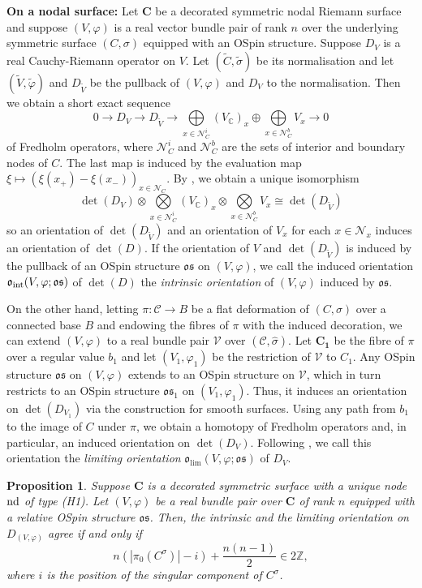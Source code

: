 \documentclass[11pt,psamsfonts, oneside, reqno]{amsart}
\newcommand{\cl}{\colon}
\newcommand{\bC}{\mathbb{C}}
\newcommand{\bZ}{\mathbb{Z}}
\newcommand{\cC}{\mathcal{C}}
\newcommand{\cN}{\mathcal{N}}
\newcommand{\cV}{\mathcal{V}}
\newcommand{\fo}{\mathfrak{o}}
\newcommand{\fs}{\mathfrak{s}}
\newcommand{\wt}{\widetilde}
\newcommand{\wh}{\widehat}
\newtheorem{proposition}[theorem]{Proposition}
\theoremstyle{definition}
\theoremstyle{remark}
\numberwithin{equation}{section}
\begin{document}
\noindent\textbf{On a nodal surface:} Let $\mathbf{C}$ be a decorated symmetric nodal Riemann surface and suppose $(V,\varphi)$ is a real vector bundle pair of rank $n$ over the underlying symmetric surface $(C,\sigma)$ equipped with an OSpin structure. Suppose $D_V$ is a real Cauchy-Riemann operator on $V$. Let $(\wt C,\wt\sigma)$ be its normalisation and let $(\wt V,\wt\varphi)$ and $D_{\wt V}$ be the pullback of $(V,\varphi)$ and $D_V$ to the normalisation. Then we obtain a short exact sequence 
$$0 \to D_V \to D_{\wt V}\to \bigoplus\limits_{x\in \cN^i_C}(V_\bC)_x\oplus \bigoplus\limits_{x\in \cN^b_C}V_x\to 0$$\noindent
of Fredholm operators, where $\cN^i_C$ and $\cN^b_C$ are the sets of interior and boundary nodes of $C$. The last map is induced by the evaluation map $\xi \mapsto (\xi(x_+)-\xi(x_-))_{x\in \cN_C}$. By \cite{Zi16}, we obtain a unique isomorphism 
$$\det(D_V) \otimes \bigotimes\limits_{x\in \cN^i_C}(V_\bC)_x\otimes \bigotimes\limits_{x\in \cN^b_C}V_x\cong \det(D_{\wt V})$$\noindent
so an orientation of $\det(D_{\wt V})$ and an orientation of $V_x$ for each $x \in \cN_x$ induces an orientation of $\det(D)$. If the orientation of $V$ and $\det(D_{\wt V})$ is induced by the pullback of an OSpin structure $\fo\fs$ on $(V,\varphi)$, we call the induced orientation $\fo_{\normalfont\text{int}}(V,\varphi;\fo\fs)$ of $\det(D)$ the \emph{intrinsic orientation} of $(V,\varphi)$ induced by $\fo\fs$.\par 
On the other hand, letting $\pi \cl \cC\to B$ be a flat deformation of $(C,\sigma)$ over a connected base $B$ and endowing the fibres of $\pi$ with the induced decoration, we can extend $(V,\varphi)$ to a real bundle pair $\cV$ over $(\cC,\wh\sigma)$. Let $\mathbf{C_1}$ be the fibre of $\pi$ over a regular value $b_1$ and let $(V_1,\varphi_1)$ be the restriction of $\cV$ to $C_1$. Any OSpin structure $\fo\fs$ on $(V,\varphi)$ extends to an OSpin structure on $\cV$, which in turn restricts to an OSpin structure $\fo\fs_1$ on $(V_1,\varphi_1)$. Thus, it induces an orientation on $\det(D_{V_1})$ via the construction for smooth surfaces. Using any path from $b_1$ to the image of $C$ under $\pi$, we obtain a homotopy of Fredholm operators and, in particular, an induced orientation on $\det(D_V)$. Following \cite{CZ24}, we call this orientation the \emph{limiting orientation} $\fo_{\lim}(V,\varphi;\fo\fs)$ of $D_V$.




\begin{proposition}\label{prop:orientation-for-H1-node} Suppose $\mathbf{C}$ is a decorated symmetric surface with a unique node $\normalfont\text{nd}$ of type (H1). Let $(V,\varphi)$ be a real bundle pair over $\mathbf{C}$ of rank $n$ equipped with a relative OSpin structure $\fo\fs$. Then, the intrinsic and the limiting orientation on $D_{(V,\varphi)}$ agree if and only if 
	\begin{equation}\label{} n(|\pi_0(C^\sigma)|-i) + \frac{n(n-1)}{2} \in 2\bZ,\end{equation} 
	where $i$ is the position of the singular component of $C^\sigma$.
\end{proposition}
\end{document}
